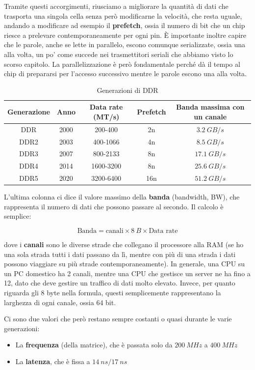 \documentclass[11pt, a4paper, titlepage, oneside]{scrbook}
\begin{document}
Tramite questi accorgimenti, riusciamo a migliorare la quantità di dati che trasporta una singola cella senza però modificarne la velocità, che resta uguale, andando a modificare ad esempio il \textbf{prefetch}, ossia il numero di bit che un chip riesce a prelevare contemporaneamente per ogni pin. È importante inoltre capire che le parole, anche se lette in parallelo, escono comunque serializzate, ossia una alla volta, un po' come succede nei trasmettitori seriali che abbiamo visto lo scorso capitolo. La parallelizzazione è però fondamentale perché dà il tempo al chip di prepararsi per l'accesso successivo mentre le parole escono una alla volta.

\begin{table}[H]
\centering
\begin{tabular}{|c|c|c|c|c|}
\hline
\textbf{Generazione} & \textbf{Anno} & \textbf{Data rate (MT/s)} & \textbf{Prefetch} & \textbf{Banda  massima con un canale} \\
\hline
DDR & 2000 & 200-400 & 2n & $\SI{3.2}{GB/s}$ \\
DDR2 & 2003 & 400-1066 & 4n & $\SI{8.5}{GB/s}$ \\
DDR3 & 2007 & 800-2133 & 8n & $\SI{17.1}{GB/s}$ \\
DDR4 & 2014 & 1600-3200 & 8n & $\SI{25.6}{GB/s}$ \\
DDR5 & 2020 & 3200-6400 & 16n & $\SI{51.2}{GB/s}$ \\ 
\hline
\end{tabular}
\caption{Generazioni di DDR}
\end{table}

L'ultima colonna ci dice il valore massimo della \textbf{banda} (bandwidth, BW), che rappresenta il numero di dati che possono passare al secondo. Il calcolo è semplice:

\[
\text{Banda} = \text{canali} \times \SI{8}{B} \times \text{Data rate} 
\]

dove i \textbf{canali} sono le diverse strade che collegano il processore alla RAM (se ho una sola strada tutti i dati passano da lì, mentre con più di una strada i dati possono viaggiare su più strade contemporaneamente). In generale, una CPU su un PC domestico ha 2 canali, mentre una CPU che gestisce un server ne ha fino a 12, dato che deve gestire un traffico di dati molto elevato. Invece, per quanto riguarda gli $8$ byte nella formula, questi semplicemente rappresentano la larghezza di ogni canale, ossia 64 bit.

Ci sono due valori che però restano sempre costanti o quasi durante le varie generazioni:
\begin{itemize}
    \item La \textbf{frequenza} (della matrice), che è passata solo da $\SI{200}{MHz}$ a $\SI{400}{MHz}$
    \item La \textbf{latenza}, che è fissa a $\SI{14}{ns}/\SI{17}{ns}$
\end{itemize} 
\end{document}
